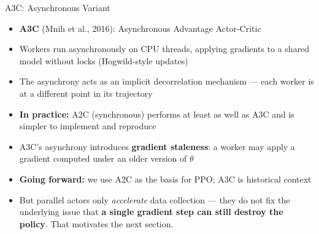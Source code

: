 \begin{frame}{A3C: Asynchronous Variant}
\begin{itemize}
    \item \textbf{A3C} (Mnih et al., 2016): Asynchronous Advantage Actor-Critic
    \item Workers run asynchronously on CPU threads, applying gradients to a shared model without locks (Hogwild-style updates)
    \item The asynchrony acts as an implicit decorrelation mechanism --- each worker is at a different point in its trajectory
    \pause
    \item \textbf{In practice:} A2C (synchronous) performs at least as well as A3C and is simpler to implement and reproduce
    \item A3C's asynchrony introduces \textbf{gradient staleness}: a worker may apply a gradient computed under an older version of $\theta$
    \pause
    \item \textbf{Going forward:} we use A2C as the basis for PPO; A3C is historical context
    \pause
    \item But parallel actors only \emph{accelerate} data collection --- they do not fix the underlying issue that \textbf{a single gradient step can still destroy the policy}. That motivates the next section.
\end{itemize}
\end{frame}
